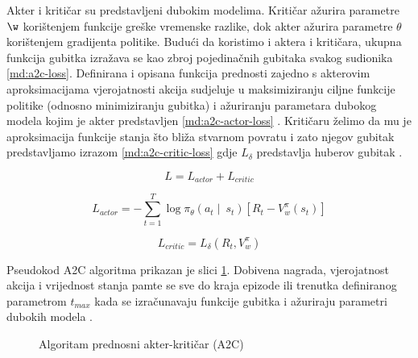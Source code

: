 \bigskip

Akter i kritičar su predstavljeni dubokim modelima. Kritičar ažurira parametre $\w$ korištenjem funkcije greške vremenske razlike, dok akter ažurira parametre $\theta$ korištenjem gradijenta politike. Budući da koristimo i aktera i kritičara, ukupna funkcija gubitka izražava se kao zbroj pojedinačnih gubitaka svakog sudionika \ref{md:a2c-loss}. Definirana i opisana funkcija prednosti zajedno s akterovim aproksimacijama vjerojatnosti akcija sudjeluje u maksimiziranju ciljne funkcije politike (odnosno minimiziranju gubitka) i ažuriranju parametara dubokog modela kojim je akter predstavljen \ref{md:a2c-actor-loss} \cite{tensorflow}. Kritičaru želimo da mu je aproksimacija funkcije stanja što bliža stvarnom povratu i zato njegov gubitak predstavljamo izrazom \ref{md:a2c-critic-loss} gdje $L_\delta$ predstavlja huberov gubitak  \cite{tensorflow}.

\begin{equation}
    \label{md:a2c-loss}
    L = L_{actor} + L_{critic}
\end{equation}

\begin{equation}
    \label{md:a2c-actor-loss}
    L_{actor} = - \sum_{t=1}^{T}\log \pi_\theta (a_t \mid \ s_t) \left[ R_t - V_{w}^{\pi} (s_t) \right]
\end{equation}

\begin{equation}
    \label{md:a2c-critic-loss}
    L_{critic} = L_\delta(R_t, V_{w}^{\pi})
\end{equation}

\bigskip

Pseudokod A2C algoritma prikazan je slici \ref{fig:a2c-algorithm}. Dobivena nagrada, vjerojatnost akcija i vrijednost stanja pamte se sve do kraja epizode ili trenutka definiranog parametrom $t_{max}$ kada se izračunavaju funkcije gubitka i ažuriraju parametri dubokih modela \cite{A2C}.

\begin{figure}[H]
    \centering
    \caption{Algoritam prednosni akter-kritičar (A2C) \cite{A2C}}
    \label{fig:a2c-algorithm}
\end{figure}
